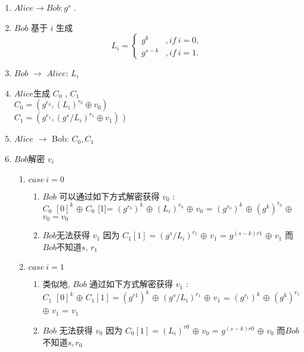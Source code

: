 \begin{enumerate}
    \begin{enumerate}
    \item $Alice  \rightarrow  Bob:  g^ {s} $ .
    \item $Bob$ 基于 $i$ 生成 $$L_i  =  \begin{cases} g^k  &,  if~ i = 0 ,\\ g^{s-k} &,if~i=1.\end{cases} $$
    \item $Bob$ $ \rightarrow $ $Alice$: $ L_ {i} $ 
    \item $Alice$生成 $ C_ {0} $ , $ C_ {1} $\\
       $ C_ {0}  =(g^{r_0} ,(L_i)^{r_0} \oplus   v_ {0} )$ \\
       $ C_ {1}  =(g^{r_1} ,(g^s / L_i)^{r_1} \oplus   v_ {1} )$ )
    \item  $Alice$ $ \rightarrow $ Bob: $ C_0, C_1 $ 
    \item  $Bob$解密 $ v_ {i} $ 
        \begin{enumerate}    
        \item  $case ~i=0$
            \begin{enumerate}            
            \item  $Bob$ 可以通过如下方式解密获得 $ v_ {0} $ :\\
               $ C_ {0} $ $ [0]^ {k} $ $ \oplus $ $ C_ {0} $ [1]= $ (g^ {r_ {0}})^ {k} $ $ \oplus $ $ (L_ {i})^ {r_ {0}} $ $ \oplus $ $ v_ {0} $ = $ (g^ {r_ {0}})^ {k} $ $ \oplus $ $ (g^ {k})^ {r_ {0}} $ $ \oplus $ $v_0=v_0$
            \item  $Bob$无法获得 $ v_ {1} $ 因为 $ C_ {1}  [1]=  (g^ {s}/L_{i})^ {r_ {1}} $ $ \oplus $ $ v_ {1} $ = $ g^ {(s-k)r1} $ $ \oplus $ $ v_ {1} $ 而$Bob$不知道$s$, $ r_ {1} $ 
            \end{enumerate}
        \item  $case~ i=1$
            \begin{enumerate}
           \item  类似地, $Bob$ 通过如下方式解密获得 $ v_ {1} $ :\\
            $ C_ {1} $ $ [0]^ {k} $ $ \oplus $ $ C_ {1}  [1]=  (g^ {r1})^ {k} $ $ \oplus $ $ (g^ {s}/L_ {i})^ {r_ {1}} $ $ \oplus $ $ v_ {1} $ = $ (g^ {r_ {1}})^ {k} $ $ \oplus $ $ (g^ {k})^ {r_ {1}} $ $ \oplus $ $ v_ {1} $ = $ v_ {1} $ 
           \item  $ Bob $ 无法获得 $ v_ {0} $ 因为 $ C_ {0}  [1]=  (L_ {i})^ {r0} $ $ \oplus $ $ v_ {0} $ = $ g^ {(s-k)r0} $ $ \oplus $ $ v_ {0} $ 而$Bob$不知道$s,r_0$
           \end{enumerate}

\end{enumerate}
\end{enumerate}
\end{enumerate}
